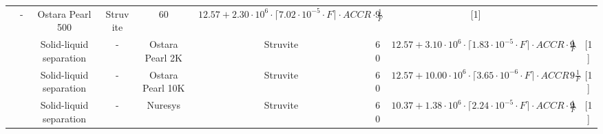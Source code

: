 \documentclass[authoryear]{elsarticle}
\begin{document}
\begin{table}
{\begin{threeparttable}
\begin{tabular}{@{}cccccccccc@{}}
				&   -
				& Ostara Pearl 500                                                                             & Struvite                                                                          & 60                                                                                    &  $12.57 + 2.30 \cdot 10^6 \cdot \lceil 7.02 \cdot 10^{-5} \cdot F \rceil \cdot ACCR \cdot \frac{1}{F}$                                & 9                                                            & [1]         \\
				& & Solid-liquid separation
				&     -
				& Ostara Pearl 2K                                                                             & Struvite                                                                          & 60                                                                                    & $12.57 + 3.10 \cdot 10^6 \cdot \lceil 1.83 \cdot 10^{-5} \cdot F \rceil \cdot ACCR \cdot \frac{1}{F}$                                 & 9                                                            &  [1]        \\
				& & Solid-liquid separation
				&      -
				& Ostara Pearl 10K                                                                             & Struvite                                                                          & 60                                                                                    &  $12.57 + 10.00 \cdot 10^6 \cdot \lceil 3.65 \cdot 10^{-6} \cdot F \rceil \cdot ACCR \cdot \frac{1}{F}$                                  & 9                                                            &   [1]       \\
				&                                                                                                                                                         & Solid-liquid separation
				&              -
				& Nuresys                                                                                  & Struvite                                                                          & 60                                                                                    & $10.37 + 1.38 \cdot 10^6 \cdot \lceil 2.24 \cdot 10^{-5} \cdot F \rceil \cdot ACCR \cdot \frac{1}{F}$                                  & 9                                                            & [1]         \\

\end{tabular}
\end{threeparttable}}
\end{table}
\end{document}
